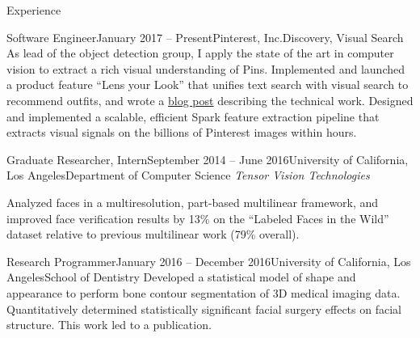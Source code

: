 \documentclass{resume}
\begin{document}
\begin{component}{Experience}
  \vspace{0.25em}
  \begin{position}{Software Engineer}{January 2017 -- Present}{Pinterest, Inc.}{Discovery, Visual Search}
    {As lead of the object detection group, I apply the state of the art in computer vision to extract a rich visual understanding of Pins. Implemented and launched a product feature ``Lens your Look'' that unifies text search with visual search to recommend outfits, and wrote a \href{https://medium.com/@Pinterest_Engineering/building-lens-your-look-unifying-text-and-camera-search-1b2f3ef4e393}{blog post} describing the technical work.
      Designed and implemented a scalable, efficient Spark feature extraction pipeline that extracts visual signals on the billions of Pinterest images within hours. }
  \end{position}
  
	\begin{position}{Graduate Researcher, Intern}{September 2014 -- June 2016}{University of California, Los Angeles}{Department of Computer Science}
	\emph{Tensor Vision Technologies}

    {Analyzed faces in a multiresolution, part-based multilinear framework, and improved face verification results by 13\% on the ``Labeled Faces in the Wild'' dataset relative to previous multilinear work (79\% overall).
}
	\end{position}

\vspace{-0.25em}

    \begin{position}{Research Programmer}{January 2016 -- December 2016}{University of California, Los Angeles}{School of Dentistry}
{
Developed a statistical model of shape and appearance to perform bone contour segmentation of 3D medical imaging data.
\\
Quantitatively determined statistically significant facial surgery effects on facial structure.
This work led to a publication.
}
      \end{position}


\end{component}
\end{document}
